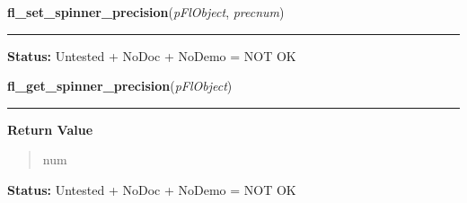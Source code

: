     \vspace{0.5ex}

\hspace{.8\funcindent}\begin{boxedminipage}{\funcwidth}

    \raggedright \textbf{fl\_set\_spinner\_precision}(\textit{pFlObject}, \textit{precnum})

    \vspace{-1.5ex}

    \rule{\textwidth}{0.5\fboxrule}
\setlength{\parskip}{2ex}
\setlength{\parskip}{1ex}
\textbf{Status:} Untested + NoDoc + NoDemo = NOT OK



    \end{boxedminipage}

    \label{xformslib:flspinner:fl_get_spinner_precision}

    \vspace{0.5ex}

\hspace{.8\funcindent}\begin{boxedminipage}{\funcwidth}

    \raggedright \textbf{fl\_get\_spinner\_precision}(\textit{pFlObject})

    \vspace{-1.5ex}

    \rule{\textwidth}{0.5\fboxrule}
\setlength{\parskip}{2ex}
\setlength{\parskip}{1ex}
      \textbf{Return Value}
    \vspace{-1ex}

      \begin{quote}
      num

      \end{quote}

\textbf{Status:} Untested + NoDoc + NoDemo = NOT OK



    \end{boxedminipage}

    \label{xformslib:flspinner:fl_get_spinner_input}

    \vspace{0.5ex}

